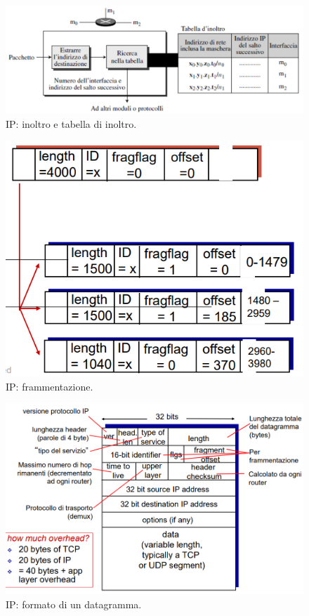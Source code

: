 \documentclass[11pt, italian, openany]{book}
\begin{document}
\begin{sloppypar}
\begin{figure}[!h]
	\centering
	\includegraphics[scale=0.35]{images/ip-tabella-inoltro.png}
	\caption{IP: inoltro e tabella di inoltro.}
	\label{fig:ip-tabella-inoltro}
\end{figure}

\pagebreak

\begin{figure}[!h]
	\centering
	\includegraphics[scale=0.5]{images/ip-frammentazione.png}
	\caption{IP: frammentazione.}
	\label{fig:ip-frammentazione}
\end{figure}

\pagebreak

\begin{figure}[!h]
	\centering
	\includegraphics[scale=0.5]{images/ip-datagramma.png}
	\caption{IP: formato di un datagramma.}
	\label{fig:ip-datagramma}
\end{figure}


\end{sloppypar}
\end{document}
